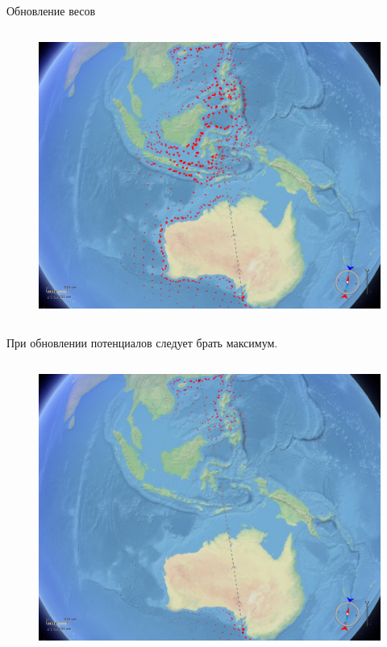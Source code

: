 \documentclass[russian, hyperref={unicode}]{beamer}
\theoremstyle{definition}
\begin{document}
\begin{frame}{Обновление весов}
{\begin{columns}
            \begin{figure}
                \includegraphics[clip=true, trim = 280pt 0 20pt 0, width=\textwidth]{potentials-update/max1}
            \end{figure}
        \end{columns}

        \begin{center}
            При обновлении потенциалов следует брать максимум.
        \end{center}
    }
   
     {
        \begin{columns}
            \begin{figure}
                \includegraphics[clip=true, trim = 280pt 0 20pt 0, width=\textwidth]{potentials-update/accum2}
            \end{figure}


\end{columns}}
\end{frame}
\end{document}
